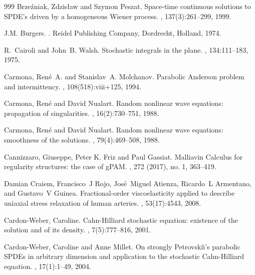 \documentclass[a4paper,12pt]{article}
\theoremstyle{plain}
\theoremstyle{definition}
\begin{document}
\begin{thebibliography}{999}
Brze{\'z}niak, Zdzis{\l}aw and Szymon Peszat.
\newblock Space-time continuous solutions to {SPDE}'s driven by a homogeneous
  {W}iener process.
, 137(3):261--299, 1999.

J.M. Burgers.
.
\newblock Reidel Publishing Company, Dordrecht, Holland, 1974.


R.~Cairoli and John~B. Walsh.
\newblock Stochastic integrals in the plane.
, 134:111--183, 1975.

Carmona, Ren{\'e}~A. and Stanislav~A. Molchanov.
\newblock Parabolic {A}nderson problem and intermittency.
, 108(518):viii+125, 1994.

Carmona, Ren{\'e} and David Nualart.
\newblock Random nonlinear wave equations: propagation of singularities.
, 16(2):730--751, 1988.

Carmona, Ren{\'e} and David Nualart.
\newblock Random nonlinear wave equations: smoothness of the solutions.
, 79(4):469--508, 1988.

Cannizzaro, Giuseppe, Peter K. Friz and Paul Gassiat.
\newblock Malliavin Calculus for regularity structures: the case of gPAM.
, 272 (2017), no. 1, 363--419.

Damian Craiem, Francisco~J Rojo, Jos{\'e}~Miguel Atienza, Ricardo~L Armentano,
  and Gustavo~V Guinea.
\newblock Fractional-order viscoelasticity applied to describe uniaxial stress
  relaxation of human arteries.
, 53(17):4543, 2008.

Cardon-Weber, Caroline.
\newblock Cahn-{H}illiard stochastic equation: existence of the solution and of
  its density.
, 7(5):777--816, 2001.

Cardon-Weber, Caroline and Anne Millet.
\newblock On strongly {P}etrovski\u\i's parabolic {SPDE}s in arbitrary
  dimension and application to the stochastic {C}ahn-{H}illiard equation.
, 17(1):1--49, 2004.


\end{thebibliography}
\end{document}
